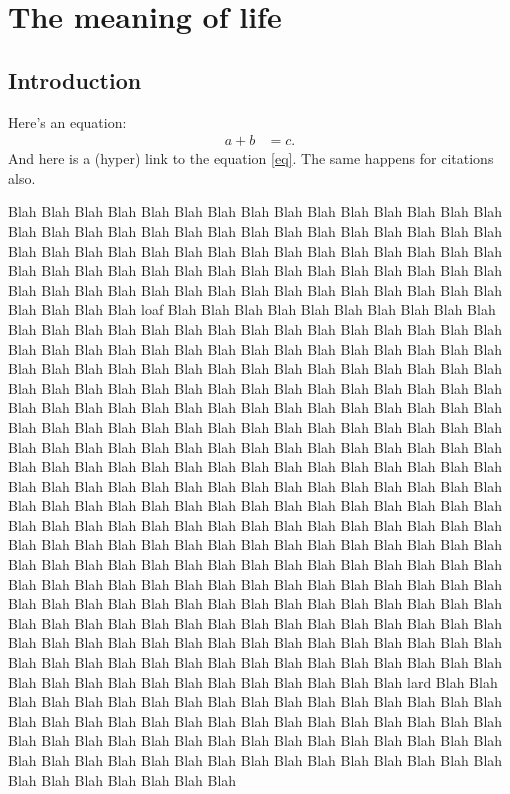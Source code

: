 \chapter{The meaning of life}

\section{Introduction}
Here's an equation:
\begin{align}
	a + b &= c.
	\label{eq}
\end{align}
And here is a (hyper) link to the equation \eqref{eq}.  The same
happens for citations also.

Blah Blah Blah Blah Blah Blah Blah Blah Blah Blah Blah Blah Blah
Blah Blah Blah Blah Blah Blah Blah Blah Blah Blah Blah Blah Blah
Blah Blah Blah Blah Blah Blah Blah Blah Blah Blah Blah Blah Blah
Blah Blah Blah Blah Blah Blah Blah Blah Blah Blah Blah Blah Blah
Blah Blah Blah Blah Blah Blah Blah Blah Blah Blah Blah Blah Blah
Blah Blah Blah Blah Blah Blah Blah Blah Blah Blah Blah Blah Blah
Blah loaf Blah Blah Blah Blah Blah Blah Blah Blah Blah Blah Blah
Blah Blah Blah Blah Blah Blah Blah Blah Blah Blah Blah Blah Blah
Blah Blah Blah Blah Blah Blah Blah Blah Blah Blah Blah Blah Blah
Blah Blah Blah Blah Blah Blah Blah Blah Blah Blah Blah Blah Blah
Blah Blah Blah Blah Blah Blah Blah Blah Blah Blah Blah Blah Blah
Blah Blah Blah Blah Blah Blah Blah Blah Blah Blah Blah Blah Blah
Blah Blah Blah Blah Blah Blah Blah Blah Blah Blah Blah Blah Blah
Blah Blah Blah Blah Blah Blah Blah Blah Blah Blah Blah Blah Blah
Blah Blah Blah Blah Blah Blah Blah Blah Blah Blah Blah Blah Blah
Blah Blah Blah Blah Blah Blah Blah Blah Blah Blah Blah Blah Blah
Blah Blah Blah Blah Blah Blah Blah Blah Blah Blah Blah Blah Blah
Blah Blah Blah Blah Blah Blah Blah Blah Blah Blah Blah Blah Blah
Blah Blah Blah Blah Blah Blah Blah Blah Blah Blah Blah Blah Blah
Blah Blah Blah Blah Blah Blah Blah Blah Blah Blah Blah Blah Blah
Blah Blah Blah Blah Blah Blah Blah Blah Blah Blah Blah Blah Blah
Blah Blah Blah Blah Blah Blah Blah Blah Blah Blah Blah Blah Blah
Blah Blah Blah Blah Blah Blah Blah Blah Blah Blah Blah Blah Blah
Blah Blah Blah Blah Blah Blah Blah Blah Blah Blah Blah Blah Blah
Blah Blah Blah Blah Blah Blah Blah Blah Blah Blah Blah Blah Blah
Blah Blah Blah Blah Blah Blah Blah Blah Blah Blah Blah Blah Blah
Blah Blah Blah Blah Blah Blah Blah Blah Blah Blah Blah Blah Blah
Blah Blah Blah Blah Blah Blah Blah Blah Blah Blah Blah Blah Blah
Blah Blah Blah Blah Blah Blah Blah Blah lard Blah Blah Blah Blah
Blah Blah Blah Blah Blah Blah Blah Blah Blah Blah Blah Blah Blah
Blah Blah Blah Blah Blah Blah Blah Blah Blah Blah Blah Blah Blah
Blah Blah Blah Blah Blah Blah Blah Blah Blah Blah Blah Blah Blah
Blah Blah Blah Blah Blah Blah Blah Blah Blah Blah Blah Blah Blah
Blah Blah Blah Blah Blah Blah Blah Blah Blah Blah Blah Blah Blah

